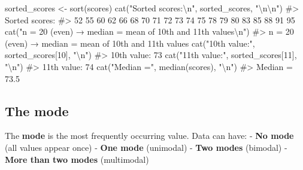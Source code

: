 \documentclass[
  11pt,
  a4paper,
  oneside,
  open=any]{scrbook}
\newenvironment{Shaded}{\begin{snugshade}}{\end{snugshade}}
\newcommand{\CommentTok}[1]{\textcolor[rgb]{0.37,0.37,0.37}{#1}}
\newcommand{\DecValTok}[1]{\textcolor[rgb]{0.68,0.00,0.00}{#1}}
\newcommand{\FunctionTok}[1]{\textcolor[rgb]{0.28,0.35,0.67}{#1}}
\newcommand{\NormalTok}[1]{\textcolor[rgb]{0.00,0.23,0.31}{#1}}
\newcommand{\OtherTok}[1]{\textcolor[rgb]{0.00,0.23,0.31}{#1}}
\newcommand{\SpecialCharTok}[1]{\textcolor[rgb]{0.37,0.37,0.37}{#1}}
\newcommand{\StringTok}[1]{\textcolor[rgb]{0.13,0.47,0.30}{#1}}
\begin{document}
\begin{Shaded}
\begin{Highlighting}[]
\NormalTok{sorted\_scores }\OtherTok{\textless{}{-}} \FunctionTok{sort}\NormalTok{(scores)}
\FunctionTok{cat}\NormalTok{(}\StringTok{"Sorted scores:}\SpecialCharTok{\textbackslash{}n}\StringTok{"}\NormalTok{, sorted\_scores, }\StringTok{"}\SpecialCharTok{\textbackslash{}n\textbackslash{}n}\StringTok{"}\NormalTok{)}
\CommentTok{\#\textgreater{} Sorted scores:}
\CommentTok{\#\textgreater{}  52 55 60 62 66 68 70 71 72 73 74 75 78 79 80 83 85 88 91 95}
\FunctionTok{cat}\NormalTok{(}\StringTok{"n = 20 (even) → median = mean of 10th and 11th values}\SpecialCharTok{\textbackslash{}n}\StringTok{"}\NormalTok{)}
\CommentTok{\#\textgreater{} n = 20 (even) → median = mean of 10th and 11th values}
\FunctionTok{cat}\NormalTok{(}\StringTok{"10th value:"}\NormalTok{, sorted\_scores[}\DecValTok{10}\NormalTok{], }\StringTok{"}\SpecialCharTok{\textbackslash{}n}\StringTok{"}\NormalTok{)}
\CommentTok{\#\textgreater{} 10th value: 73}
\FunctionTok{cat}\NormalTok{(}\StringTok{"11th value:"}\NormalTok{, sorted\_scores[}\DecValTok{11}\NormalTok{], }\StringTok{"}\SpecialCharTok{\textbackslash{}n}\StringTok{"}\NormalTok{)}
\CommentTok{\#\textgreater{} 11th value: 74}
\FunctionTok{cat}\NormalTok{(}\StringTok{"Median ="}\NormalTok{, }\FunctionTok{median}\NormalTok{(scores), }\StringTok{"}\SpecialCharTok{\textbackslash{}n}\StringTok{"}\NormalTok{)}
\CommentTok{\#\textgreater{} Median = 73.5}
\end{Highlighting}
\end{Shaded}

\subsection{The mode}\label{the-mode}

The \textbf{mode} is the most frequently occurring value. Data can have:
- \textbf{No mode} (all values appear once) - \textbf{One mode}
(unimodal) - \textbf{Two modes} (bimodal) - \textbf{More than two modes}
(multimodal)
\end{document}
